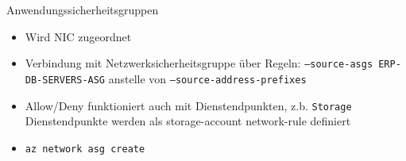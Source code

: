 \begin{flashcard}[Definition]{Anwendungssicherheitsgruppen}
    \begin{itemize}
        \item Wird NIC zugeordnet
        \item Verbindung mit Netzwerksicherheitsgruppe über Regeln:\newline
            \texttt{--source-asgs ERP-DB-SERVERS-ASG} anstelle von \texttt{--source-address-prefixes}
        \item Allow/Deny funktioniert auch mit Dienstendpunkten, z.b. \texttt{Storage} \newline
            Dienstendpunkte werden als storage-account network-rule definiert
        \item \texttt{az network asg create}
    \end{itemize}
\end{flashcard}
